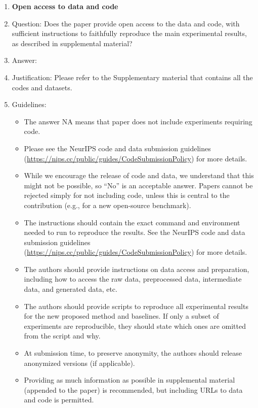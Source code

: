 \documentclass{article}
\begin{document}
\begin{enumerate}
\item {\bf Open access to data and code}
    \item[] Question: Does the paper provide open access to the data and code, with sufficient instructions to faithfully reproduce the main experimental results, as described in supplemental material?
    \item[] Answer: \answerYes{} %
    \item[] Justification: Please refer to the Supplementary material that contains all the codes and datasets.
    \item[] Guidelines:
    \begin{itemize}
        \item The answer NA means that paper does not include experiments requiring code.
        \item Please see the NeurIPS code and data submission guidelines (\url{https://nips.cc/public/guides/CodeSubmissionPolicy}) for more details.
        \item While we encourage the release of code and data, we understand that this might not be possible, so “No” is an acceptable answer. Papers cannot be rejected simply for not including code, unless this is central to the contribution (e.g., for a new open-source benchmark).
        \item The instructions should contain the exact command and environment needed to run to reproduce the results. See the NeurIPS code and data submission guidelines (\url{https://nips.cc/public/guides/CodeSubmissionPolicy}) for more details.
        \item The authors should provide instructions on data access and preparation, including how to access the raw data, preprocessed data, intermediate data, and generated data, etc.
        \item The authors should provide scripts to reproduce all experimental results for the new proposed method and baselines. If only a subset of experiments are reproducible, they should state which ones are omitted from the script and why.
        \item At submission time, to preserve anonymity, the authors should release anonymized versions (if applicable).
        \item Providing as much information as possible in supplemental material (appended to the paper) is recommended, but including URLs to data and code is permitted.
    \end{itemize}



\end{enumerate}
\end{document}
